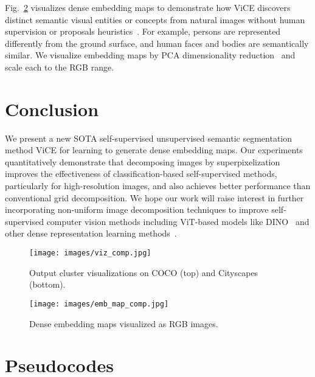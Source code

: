 \documentclass{bmvc2k}
\begin{document}
Fig.~\ref{fig:viz_embs} visualizes dense embedding maps to demonstrate how ViCE discovers distinct semantic visual entities or concepts from natural images without human supervision or proposals heuristics~\cite{Uijlings2013SelectiveSearch, Bar2021DETReg}. For example, persons are represented differently from the ground surface, and human faces and bodies are semantically similar. We visualize embedding maps by PCA dimensionality reduction~\cite{Pearson1901PCA} and scale each  to the RGB range.

\section{Conclusion}
\label{sec:conclusion}

We present a new SOTA self-supervised unsupervised semantic segmentation method ViCE for learning to generate dense embedding maps. Our experiments quantitatively demonstrate that decomposing images by superpixelization improves the effectiveness of classification-based self-supervised methods, particularly for high-resolution images, and also achieves better performance than conventional grid decomposition. We hope our work will raise interest in further incorporating non-uniform image decomposition techniques to improve self-supervised computer vision methods including ViT-based models like DINO~\cite{Caron2021DINO} and other dense representation learning methods~\cite{Pinheiro2020VADeR, Wang2012DenseCL, Li2021DSCL, Xie2021PixPro}.

\begin{figure}
\begin{center}
\texttt{[image: images/viz\_comp.jpg]}
\end{center}
   \caption{Output cluster visualizations on COCO (top) and Cityscapes (bottom).}
\label{fig:viz_unsup_clustering}
\end{figure}

\begin{figure}
\begin{center}
\texttt{[image: images/emb\_map\_comp.jpg]}
\end{center}
   \caption{Dense embedding maps visualized as RGB images.}
\label{fig:viz_embs}
\end{figure}

\appendix

\section{Pseudocodes}
\label{sec:sup_a}
\end{document}
